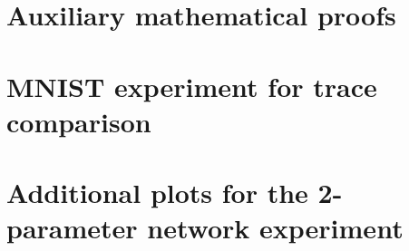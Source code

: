 \documentclass[12pt, twoside, a4paper]{report}
\begin{document}
	\nocite{*}
	\printbibliography[title=Literature]
	\begin{appendices}
		\chapter{Auxiliary mathematical proofs}
		
		\chapter{MNIST experiment for trace comparison}
		\label{sec:TraceExperimentAppendix}
		
		\chapter{Additional plots for the 2-parameter network experiment}\label{sec:2ParNetAppendix}
		
	\end{appendices}
	
	
\end{document}
